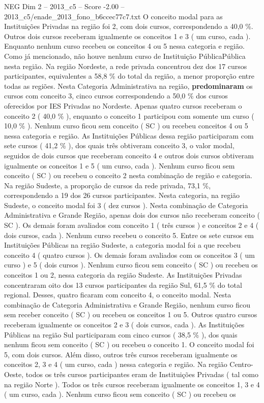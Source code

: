 \begin{textsample}{NEG Dim 2 – 2013\_c5 – Score -2.00 – 2013\_c5/enade\_2013\_fono\_b6ccec77c7.txt}
O conceito modal para as Instituições Privadas na região foi 2, com dois cursos, correspondendo a 40,0 \%.
Outros dois cursos receberam igualmente os conceitos 1 e 3 ( um curso, cada ).
Enquanto nenhum curso recebeu os conceitos 4 ou 5 nessa categoria e região.
Como já mencionado, não houve nenhum curso de Instituição PúblicaPública nesta região.
Na região Nordeste, a rede privada concentrou dez dos 17 cursos participantes, equivalentes a 58,8 \% do total da região, a menor proporção entre todas as regiões.
Nesta Categoria Administrativa na região, \textbf{predominaram} os cursos com conceito 3, cinco cursos correspondendo a 50,0 \% dos cursos oferecidos por IES Privadas no Nordeste.
Apenas quatro cursos receberam o conceito 2 ( 40,0 \% ), enquanto o conceito 1 participou com somente um curso ( 10,0 \% ).
Nenhum curso ficou sem conceito ( SC ) ou recebeu conceitos 4 ou 5 nessa categoria e região.
As Instituições Públicas dessa região participaram com sete cursos ( 41,2 \% ), dos quais três obtiveram conceito 3, o valor modal, seguidos de dois cursos que receberam conceito 4 e outros dois cursos obtiveram igualmente os conceitos 1 e 5 ( um curso, cada ).
Nenhum curso ficou sem conceito ( SC ) ou recebeu o conceito 2 nesta combinação de região e categoria.
Na região Sudeste, a proporção de cursos da rede privada, 73,1 \%, correspondendo a 19 dos 26 cursos participantes.
Nesta categoria, na região Sudeste, o conceito modal foi 3 ( dez cursos ).
Nesta combinação de Categoria Administrativa e Grande Região, apenas dois dos cursos não receberam conceito ( SC ).
Os demais foram avaliados com conceito 1 ( três cursos ) e conceitos 2 e 4 ( dois cursos, cada ).
Nenhum curso recebeu o conceito 5.
Entre os sete cursos em Instituições Públicas na região Sudeste, a categoria modal foi a que recebeu conceito 4 ( quatro cursos ).
Os demais foram avaliados com os conceitos 3 ( um curso ) e 5 ( dois cursos ).
Nenhum curso ficou sem conceito ( SC ) ou recebeu os conceitos 1 ou 2, nessa categoria da região Sudeste.
As Instituições Privadas concentraram oito dos 13 cursos participantes da região Sul, 61,5 \% do total regional.
Desses, quatro ficaram com conceito 4, o conceito modal.
Nesta combinação de Categoria Administrativa e Grande Região, nenhum curso ficou sem receber conceito ( SC ) ou recebeu os conceitos 1 ou 5.
Outros quatro cursos receberam igualmente os conceitos 2 e 3 ( dois cursos, cada ).
As Instituições Públicas na região Sul participaram com cinco cursos ( 38,5 \% ), dos quais nenhum ficou sem conceito ( SC ) ou recebeu o conceito 1.
O conceito modal foi 5, com dois cursos.
Além disso, outros três cursos receberam igualmente os conceitos 2, 3 e 4 ( um curso, cada ) nessa categoria e região.
Na região Centro-Oeste, todos os três cursos participantes eram de Instituições Privadas ( tal como na região Norte ).
Todos os três cursos receberam igualmente os conceitos 1, 3 e 4 ( um curso, cada ).
Nenhum curso ficou sem conceito ( SC ) ou recebeu os

\end{textsample}
